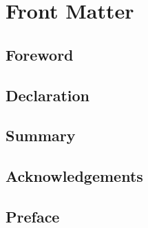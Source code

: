 \chapter*{Front Matter}

\section{Foreword}

\section{Declaration}

\section{Summary}

\section{Acknowledgements}

\section{Preface}